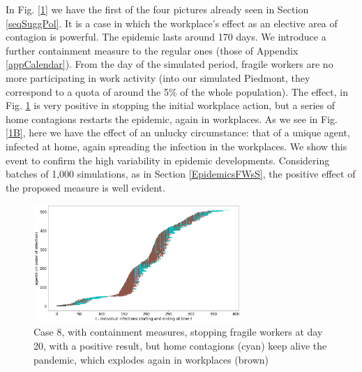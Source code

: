 \documentclass[11pt]{article}
\begin{document}
In Fig. \ref{1} we have the first of the four pictures already seen in Section \ref{seqSuggPol}. It is a case in which the workplace's effect as an elective area of contagion is powerful. The epidemic lasts around 170 days. We introduce a further containment measure to the regular ones (those of Appendix \ref{appCalendar}). From the  day of the simulated period, fragile workers are no more participating in work activity (into our simulated Piedmont, they correspond to a quota of around the 5\% of the whole population). The effect, in Fig. \ref{1A} is very positive in stopping the initial workplace action, but a series of home contagions restarts the epidemic, again in workplaces. As we see in Fig. \ref{1B}, here we have the effect of an unlucky circumstance: that of a unique agent, infected at home, again spreading the infection in the workplaces. We show this event to confirm the high variability in epidemic developments. Considering batches of 1,000 simulations, as in Section \ref{EpidemicsFWsS}, the positive effect of the proposed measure is well evident.

\begin{figure}[H]
\begin{center}
\includegraphics[width=0.7\textwidth]{withShort1A.png}%
\caption{Case 8, with containment measures, stopping fragile workers at day 20, with a positive result, but home contagions (cyan) keep alive the pandemic, which explodes again in workplaces (brown)}
\label{1A}
\end{center}
\end{figure}
\end{document}
